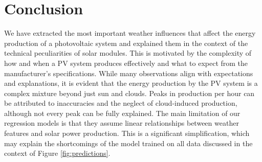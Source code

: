\documentclass{article}
\begin{document}
\section{Conclusion}

We have extracted the most important weather influences that affect the energy production of a photovoltaic system and explained them in the context of the technical peculiarities of solar modules. This is motivated by the complexity of how and when a PV system produces effectively and what to expect from the manufacturer's specifications. While many observations align with expectations and explanations, it is evident that the energy production by the PV system is a complex mixture beyond just sun and clouds. Peaks in production per hour can be attributed to inaccuracies and the neglect of cloud-induced production, although not every peak can be fully explained. The main limitation of our regression models is that they assume linear relationships between weather features and solar power production. This is a significant simplification, which may explain the shortcomings of the model trained on all data discussed in the context of Figure \ref{fig:predictions}.




\end{document}
